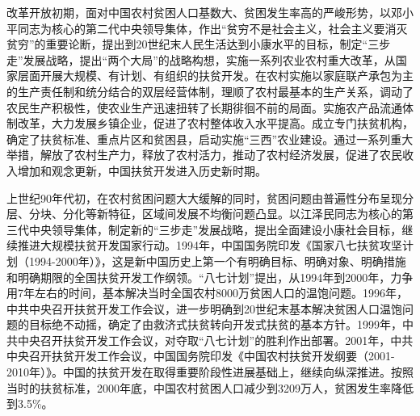 \documentclass{ctexart}
\begin{document}
改革开放初期，面对中国农村贫困人口基数大、贫困发生率高的严峻形势，以邓小平同志为核心的第二代中央领导集体，作出“贫穷不是社会主义，社会主义要消灭贫穷”的重要论断，提出到20世纪末人民生活达到小康水平的目标，制定“三步走”发展战略，提出“两个大局”的战略构想，实施一系列农业农村重大改革，从国家层面开展大规模、有计划、有组织的扶贫开发。在农村实施以家庭联产承包为主的生产责任制和统分结合的双层经营体制，理顺了农村最基本的生产关系，调动了农民生产积极性，使农业生产迅速扭转了长期徘徊不前的局面。实施农产品流通体制改革，大力发展乡镇企业，促进了农村整体收入水平提高。成立专门扶贫机构，确定了扶贫标准、重点片区和贫困县，启动实施“三西”农业建设。通过一系列重大举措，解放了农村生产力，释放了农村活力，推动了农村经济发展，促进了农民收入增加和观念更新，中国扶贫开发进入历史新时期。

上世纪90年代初，在农村贫困问题大大缓解的同时，贫困问题由普遍性分布呈现分层、分块、分化等新特征，区域间发展不均衡问题凸显。以江泽民同志为核心的第三代中央领导集体，制定新的“三步走”发展战略，提出全面建设小康社会目标，继续推进大规模扶贫开发国家行动。1994年，中国国务院印发《国家八七扶贫攻坚计划（1994-2000年）》，这是新中国历史上第一个有明确目标、明确对象、明确措施和明确期限的全国扶贫开发工作纲领。“八七计划”提出，从1994年到2000年，力争用7年左右的时间，基本解决当时全国农村8000万贫困人口的温饱问题。1996年，中共中央召开扶贫开发工作会议，进一步明确到20世纪末基本解决贫困人口温饱问题的目标绝不动摇，确定了由救济式扶贫转向开发式扶贫的基本方针。1999年，中共中央召开扶贫开发工作会议，对夺取“八七计划”的胜利作出部署。2001年，中共中央召开扶贫开发工作会议，中国国务院印发《中国农村扶贫开发纲要（2001-2010年）》。中国的扶贫开发在取得重要阶段性进展基础上，继续向纵深推进。按照当时的扶贫标准，2000年底，中国农村贫困人口减少到3209万人，贫困发生率降低到3.5\%。
\end{document}
